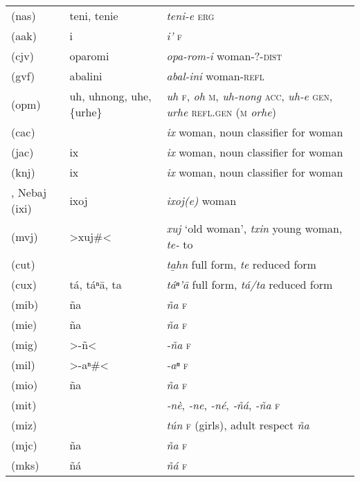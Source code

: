 {\begin{longtable}{L{.25\textwidth}L{.25\textwidth}L{.5\textwidth}}
 (nas)	&	teni, tenie	&	\textit{teni-e} \textsc{erg}	\\
 (aak)	&	i\textquotesingle{}	&	\textit{i’} \textsc{f}	\\
 (cjv)	&	oparomi	&	\textit{opa-rom-i} woman-?-\textsc{dist}	\\
 (gvf)	&	abalini	&	\textit{abal-ini} woman-\textsc{refl}	\\
 (opm)	&	uh, uhnong, uhe, \{urhe\}	&	\textit{uh} \textsc{f}, \textit{oh} \textsc{m}, \textit{uh-nong} \textsc{acc}, \textit{uh-e} \textsc{gen}, \textit{urhe} \textsc{refl.gen} (\textsc{m} \textit{orhe})	\\
 (cac)	&		&	\textit{\textquotesingle{}ix} woman, noun classifier for woman	\\
 (jac)	&	ix	&	\textit{ix} woman, noun classifier for woman	\\
 (knj)	&	ix	&	\textit{ix} woman, noun classifier for woman	\\
, Nebaj (ixi)	&	ixoj	&	\textit{ixoj(e)} woman	\\
 (mvj)	&	>xuj\#<	&	\textit{xuj} ‘old woman’, \textit{txin} young woman, \textit{te-} to	\\
 (cut)	&		&	\textit{ta̱hn} full form, \textit{te} reduced form	\\
 (cux)	&	tá, táⁿ\textquotesingle{}ā, ta	&	\textit{táⁿ’ā} full form, \textit{tá/ta} reduced form	\\
 (mib)	&	ña	&	\textit{ña} \textsc{f}	\\
 (mie)	&	ña	&	\textit{ña} \textsc{f}	\\
 (mig)	&	>-ñ<	&	\textit{-ña} \textsc{f}	\\
 (mil)	&	>-aⁿ\#<	&	\textit{-aⁿ} \textsc{f}	\\
 (mio)	&	ña	&	\textit{ña} \textsc{f}	\\
 (mit)	&		&	\textit{‑nè}, \textit{-ne}, \textit{-né}, \textit{‑ñá}, \textit{-ña} \textsc{f}	\\
 (miz)	&		&	\textit{tún} \textsc{f} (girls), adult respect \textit{ña}	\\
 (mjc)	&	ña	&	\textit{ña} \textsc{f}	\\
 (mks)	&	ñá	&	\textit{ñá} \textsc{f}	\\

\end{longtable}}
